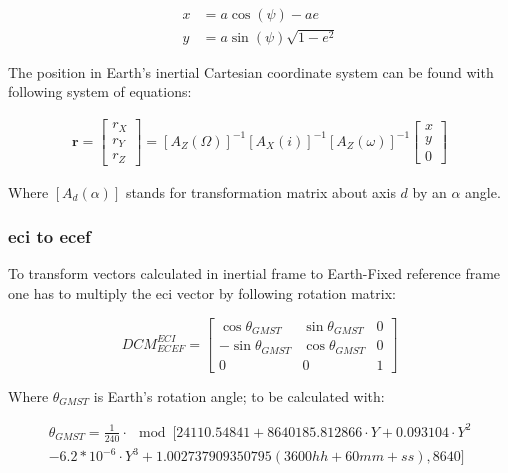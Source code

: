         \begin{align}
            x & = a\cos(\psi) -ae \\
            y &= a\sin(\psi)\sqrt{1-e^2}
        \end{align}

        The position in Earth's inertial Cartesian coordinate system can be found with following system of equations:

        \begin{align}
            \textbf{r} = \begin{bmatrix} r_X\\ r_Y\\ r_Z \end{bmatrix} = [A_Z(\Omega)]^{-1} [A_X(i)]^{-1} [A_Z(\omega)]^{-1} \begin{bmatrix} x\\ y\\ 0 \end{bmatrix}
        \end{align}

        Where $[A_d(\alpha)]$ stands for transformation matrix about axis $d$ by an $\alpha$ angle.

    \subsubsection{\ac{eci} to \ac{ecef}}
        To transform vectors calculated in inertial frame to Earth-Fixed reference frame one has to multiply the \ac{eci} vector by following rotation matrix:

        \begin{equation}
            DCM^{ECI}_{ECEF} = \begin{bmatrix} \cos\theta_{GMST} & \sin\theta_{GMST} & 0\\
            -\sin\theta_{GMST} & \cos\theta_{GMST} & 0 \\
            0 & 0 & 1 \end{bmatrix}
        \end{equation}

        Where $\theta_{GMST}$ is Earth's rotation angle; to be calculated with: 

        \begin{multline}
        \theta_{GMST}= \frac{1}{240} \cdot \mod[24110.54841 + 8640185.812866 \cdot Y + 0.093104 \cdot Y^2 \\
            - 6.2*10^{-6} \cdot Y^3 + 1.002737909350795\left(3600hh+60mm+ss\right), 8640]
        \end{multline}

